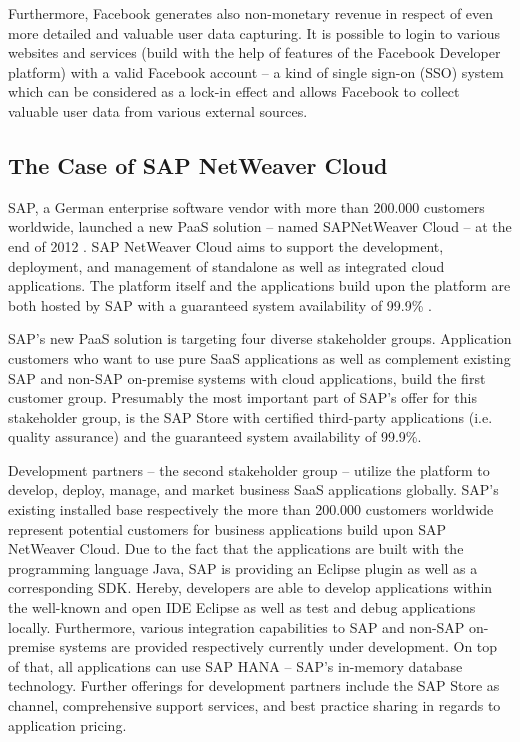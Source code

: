 Furthermore, Facebook generates also non-monetary revenue in respect of even more detailed and valuable user data capturing. It is possible to login to various websites and services (build with the help of features of the Facebook Developer platform) with a valid Facebook account -- a kind of single sign-on (SSO) system which can be considered as a lock-in effect and allows Facebook to collect valuable user data from various external sources.

\newpage


\subsection{The Case of SAP NetWeaver Cloud}\label{ch:sota:sap}

SAP, a German enterprise software vendor with more than 200.000 customers worldwide, launched a new \ac{PaaS} solution -- named SAP\linebreak NetWeaver Cloud -- at the end of 2012 \citep{SAP2013b,SAP2013a}. SAP NetWeaver Cloud aims to support the development, deployment, and management of standalone as well as integrated cloud applications. The platform itself and the applications build upon the platform are both hosted by SAP with a guaranteed system availability of 99.9\% \citep{SAP2013b}.

SAP's new \ac{PaaS} solution is targeting four diverse stakeholder groups. Application customers who want to use pure \ac{SaaS} applications as well as complement existing SAP and non-SAP on-premise systems with cloud applications, build the first customer group. Presumably the most important part of SAP's offer for this stakeholder group, is the SAP Store with certified third-party applications (i.e. quality assurance) and the guaranteed system availability of 99.9\%.

Development partners -- the second stakeholder group -- utilize the platform to develop, deploy, manage, and market business \ac{SaaS} applications globally. SAP's existing installed base respectively the more than 200.000 customers worldwide represent potential customers for business applications build upon SAP \linebreak NetWeaver Cloud. Due to the fact that the applications are built with the programming language Java, SAP is providing an Eclipse plugin as well as a corresponding \ac{SDK}. Hereby, developers are able to develop applications within the well-known and open \ac{IDE} Eclipse as well as test and debug applications locally. Furthermore, various integration capabilities to SAP and non-SAP on-premise systems are provided respectively currently under development. On top of that, all applications can use SAP HANA -- SAP's in-memory database technology. Further offerings for development partners include the SAP Store as channel, comprehensive support services, and best practice sharing in regards to application pricing.

